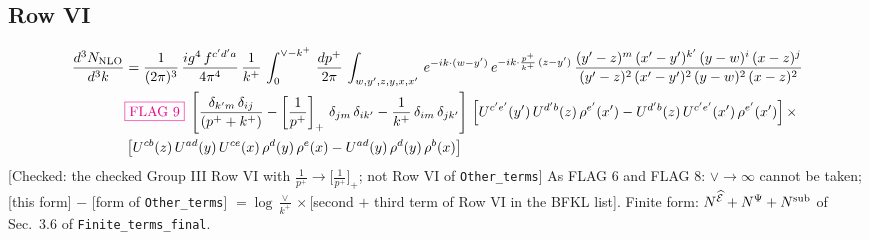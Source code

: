 \documentclass[9pt]{article}
\numberwithin{equation}{section}
\begin{document}
\subsection{Row VI}
\begin{align}
    \frac{d^{3}N_{\rm NLO}}{d^{3}k} & = \frac{1}{(2\pi)^{3}}\, \frac{ig^{4}\,f^{c'd'a}}{4\pi^{4}}\, \frac{1}{k^{+}}\,\int_{0}^{\vee-k^{+}}\, \frac{dp^{+}}{2\pi}\, \int_{w,y',z,y,x,x'}\, e^{-ik\cdot (w-y')}\, e^{-ik\cdot \frac{p^{+}}{k^{+}}\,(z-y')}\, \frac{(y'-z)^{m}\,(x'-y')^{k'}\,(y-w)^{i}\,(x-z)^{j}}{(y'-z)^{2}\,(x'-y')^{2}\,(y-w)^{2}\,(x-z)^{2}}\notag \\ & {\color{magenta}\fbox{FLAG 9}}\;\left[\frac{\delta_{k'm}\,\delta_{ij}}{(p^{+}+k^{+})}-\left[\frac{1}{p^{+}}\right]_{+}\,\delta_{jm}\,\delta_{ik'}-\frac{1}{k^{+}}\, \delta_{im}\, \delta_{jk'}\right]\, \left[U^{c'e'}(y')\,U^{d'b}(z)\,\rho^{e'}(x')-U^{d'b}(z)\,U^{c'e'}(x')\,\rho^{e'}(x')\right]\times\notag \\ &  \left[U^{cb}(z)\,U^{ad}(y)\,U^{ce}(x)\,\rho^{d}(y)\,\rho^{e}(x)-U^{ad}(y)\,\rho^{d}(y)\,\rho^{b}(x)\right]
\end{align} {\color{red}[Checked: the checked Group III Row VI with $\frac{1}{p^{+}}\to\big[\frac{1}{p^{+}}\big]_{+}$; not Row VI of \texttt{Other\_terms}]} {\color{magenta} As FLAG 6 and FLAG 8: $\vee\to\infty$ cannot be taken; [this form] $-$ [form of \texttt{Other\_terms}] $=\log\frac{\vee}{k^{+}}\times$[second $+$ third term of Row VI in the BFKL list]. Finite form: $N^{\widehat{\mathcal{E}}}+N^{\Psi}+N^{\rm sub}$ of Sec.~3.6 of \texttt{Finite\_terms\_final}.}
\end{document}
